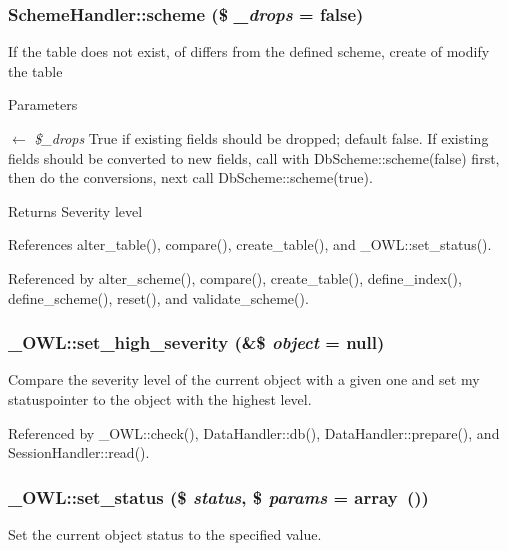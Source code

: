 \subsubsection[{scheme}]{\setlength{\rightskip}{0pt plus 5cm}SchemeHandler::scheme (\$ {\em \_\-drops} = {\ttfamily false})}\label{classSchemeHandler_a1e843dc411d175818c7b2ab5374f021e}
If the table does not exist, of differs from the defined scheme, create of modify the table 
\begin{DoxyParams}{Parameters}
\item[\mbox{$\leftarrow$} {\em \$\_\-drops}]True if existing fields should be dropped; default false. If existing fields should be converted to new fields, call with DbScheme::scheme(false) first, then do the conversions, next call DbScheme::scheme(true). \end{DoxyParams}
\begin{DoxyReturn}{Returns}
Severity level 
\end{DoxyReturn}


References alter\_\-table(), compare(), create\_\-table(), and \_\-OWL::set\_\-status().



Referenced by alter\_\-scheme(), compare(), create\_\-table(), define\_\-index(), define\_\-scheme(), reset(), and validate\_\-scheme().

\subsubsection[{set\_\-high\_\-severity}]{\setlength{\rightskip}{0pt plus 5cm}\_\-OWL::set\_\-high\_\-severity (\&\$ {\em object} = {\ttfamily null})}\label{class__OWL_a576829692a3b66e3d518853bf43abae3}
Compare the severity level of the current object with a given one and set my statuspointer to the object with the highest level. 

Referenced by \_\-OWL::check(), DataHandler::db(), DataHandler::prepare(), and SessionHandler::read().

\subsubsection[{set\_\-status}]{\setlength{\rightskip}{0pt plus 5cm}\_\-OWL::set\_\-status (\$ {\em status}, \/  \$ {\em params} = {\ttfamily array~()})}\label{class__OWL_aea912d0ede9b3c2a69b79072d94d4787}
Set the current object status to the specified value.


